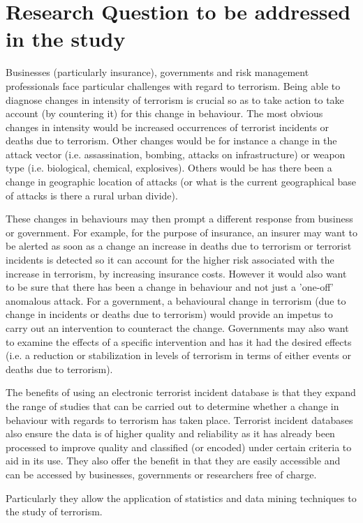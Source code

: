 \section{Research Question to be addressed in the study}
Businesses (particularly insurance), governments and risk management professionals face particular challenges with regard to terrorism. Being able to diagnose changes in intensity of terrorism is crucial so as to take action to take account (by countering it) for this change in behaviour. The most obvious changes in intensity would be increased occurrences of terrorist incidents or deaths due to terrorism. Other changes would be for instance a change in the attack vector (i.e. assassination, bombing, attacks on infrastructure) or weapon type (i.e. biological, chemical, explosives). Others would be has there been a change in geographic location of attacks (or what is the current geographical base of attacks is there a rural urban divide). 

These changes in behaviours may then prompt a different response from business or government. For example, for the purpose of insurance, an insurer may want to be alerted as soon as a change an increase in deaths due to terrorism or terrorist incidents is detected so it can account for the higher risk associated with the increase in terrorism, by increasing insurance costs. However it would also want to be sure that there has been a change in behaviour and not just a 'one-off' anomalous attack. For a government, a behavioural change in terrorism (due to change in incidents or deaths due to terrorism) would provide an impetus to carry out an intervention to counteract the change. Governments may also want to examine the effects of a specific intervention and has it had the desired effects (i.e. a reduction or stabilization in levels of terrorism in terms of either events or deaths due to terrorism). 

The benefits of using an electronic terrorist incident database is that they expand the range of studies that can be carried out to determine whether a change in behaviour with regards to terrorism has taken place. Terrorist incident databases also ensure the data is of higher quality and reliability as it has already been processed to improve quality and classified (or encoded) under certain criteria to aid in its use. They also offer the benefit in that they are easily accessible and can be accessed by businesses, governments or researchers free of charge. 

Particularly they allow the application of statistics and data mining techniques to the study of terrorism.

